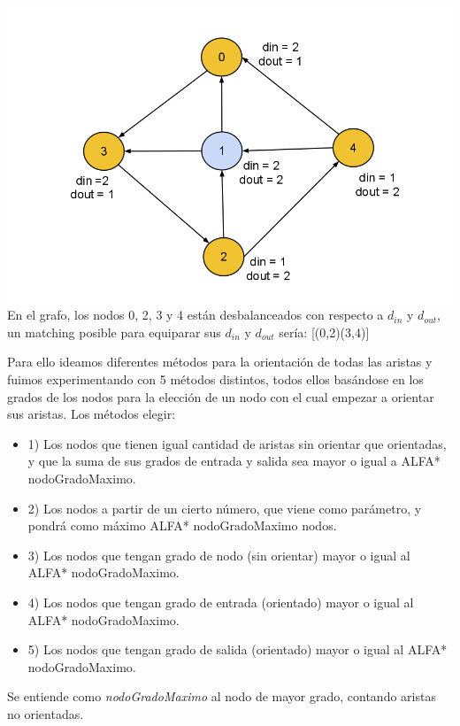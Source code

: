 \documentclass[11pt, a4paper, spanish]{article}
\begin{document}
\begin{center}
\centering \includegraphics[scale=0.30]{img/Matching2.png}\\
\small{En el grafo, los nodos 0, 2, 3 y 4 est\'an desbalanceados con respecto a $d_{in}$ y $d_{out}$, un matching posible para equiparar sus $d_{in}$ y $d_{out}$ ser\'ia: [(0,2)(3,4)]}
\end{center}

	Para ello ideamos diferentes m\'etodos para la orientaci\'on de todas las aristas y fuimos experimentando con 5 m\'etodos distintos, todos ellos bas\'andose en los grados de los nodos para la elecci\'on de un nodo con el cual empezar a orientar sus aristas. Los m\'etodos elegir:\\
	
  \begin{itemize}
	\item 1) Los nodos que tienen igual cantidad de aristas sin orientar que orientadas, y que la suma de sus grados de entrada y salida sea mayor o igual a ALFA* nodoGradoMaximo.
	\item 2) Los nodos a partir de un cierto n\'umero, que viene como par\'ametro, y pondr\'a como m\'aximo ALFA* nodoGradoMaximo nodos.
	\item 3) Los nodos que tengan grado de nodo (sin orientar) mayor o igual al ALFA* nodoGradoMaximo.
	\item 4) Los nodos que tengan grado de entrada (orientado) mayor o igual al ALFA* nodoGradoMaximo.
	\item 5) Los nodos que tengan grado de salida (orientado) mayor o igual al ALFA* nodoGradoMaximo.
  \end{itemize}

Se entiende como \emph{nodoGradoMaximo} al nodo de mayor grado, contando aristas no orientadas.\\
\end{document}
